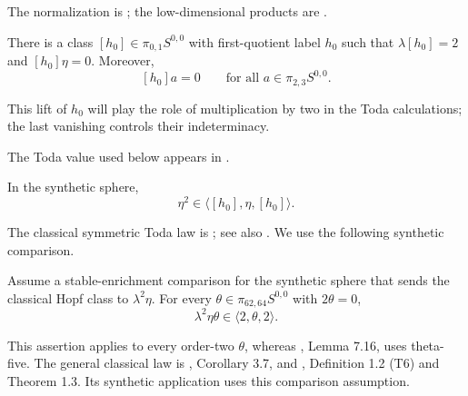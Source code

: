 \begin{proposition}
\label{sem:Literature:synthetic-h-zero}
The normalization is \cite[Example 5.8(4)]{LWX126}; the low-dimensional products are \cite[Proposition A.20 and Remark A.22]{BHS}.\par

There is a class $[h_0]\in\pi_{0,1}S^{0,0}$ with first-quotient label $h_0$ such that $\lambda[h_0]=2$ and $[h_0]\eta=0$. Moreover,
\[[h_0]a=0\qquad\text{for all }a\in\pi_{2,3}S^{0,0}.\]


This lift of $h_0$ will play the role of multiplication by two in the
Toda calculations; the last vanishing controls their indeterminacy.


\end{proposition}


\begin{theorem}
\label{sem:Literature:low-toda-comparison}
The Toda value used below appears in \cite[Lemma 7.16, proof]{LWX126}.\par

In the synthetic sphere,
\[\eta^2\in\langle[h_0],\eta,[h_0]\rangle.\]


\end{theorem}

\begin{theorem}

\label{sem:Literature:symmetric-toda-comparison}
The classical symmetric Toda law is \cite[Corollary 3.7]{Toda1962};
see also \cite[Theorem 1.3]{BauesMuro2009}. We use the following
synthetic comparison.\par

Assume a stable-enrichment comparison for the synthetic sphere that
sends the classical Hopf class to $\lambda^2\eta$.
For every $\theta\in\pi_{62,64}S^{0,0}$ with $2\theta=0$,
\[\lambda^2\eta\theta\in\langle2,\theta,2\rangle.\]


This assertion applies to every order-two $\theta$, whereas \cite{LWX126}, Lemma 7.16,
uses theta-five. The general classical law is \cite{Toda1962}, Corollary 3.7, and
\cite{BauesMuro2009}, Definition 1.2 (T6) and Theorem 1.3. Its synthetic application
uses this comparison assumption.


\end{theorem}



